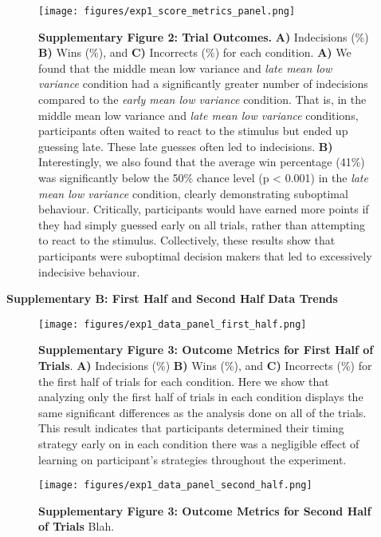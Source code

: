 \documentclass[12pt]{article}
\newcommand\boldblue[1]{\textcolor{mydarkblue}{\textbf{#1}}}
\begin{document}
\begin{figure}[H]
    \centering
    \texttt{[image: figures/exp1\_score\_metrics\_panel.png]}

    \caption*{\boldblue{Supplementary Figure 2: Trial Outcomes.} \boldblue{A)} Indecisions (\%) \boldblue{B)} Wins (\%), and \boldblue{C)} Incorrects (\%) for each condition. \boldblue{A)} We found that the middle mean low variance and \emph{late mean low variance} condition had a significantly greater number of indecisions compared to the \emph{early mean low variance} condition. That is, in the middle mean low variance and \emph{late mean low variance} conditions, participants often waited to react to the stimulus but ended up guessing late. These late guesses often led to indecisions. \boldblue{B)} Interestingly, we also found that the average win percentage (41\%) was significantly below the 50\% chance level (p < 0.001) in the \emph{late mean low variance} condition, clearly demonstrating suboptimal behaviour. Critically, participants would have earned more points if they had simply guessed early on all trials, rather than attempting to react to the stimulus. Collectively, these results show that participants were suboptimal decision makers that led to excessively indecisive behaviour.}
\end{figure}

\newpage
\noindent\boldblue{\large{Supplementary B: First Half and Second Half Data Trends}}
\vspace{-1mm}

\begin{figure}[H]
    \centering
    \texttt{[image: figures/exp1\_data\_panel\_first\_half.png]}
    \caption*{
        \boldblue{Supplementary Figure 3: Outcome Metrics for First Half of Trials}. \boldblue{A)} Indecisions (\%) \boldblue{B)} Wins (\%), and \boldblue{C)} Incorrects (\%) for the first half of trials for each condition. 
        Here we show that analyzing only the first half of trials in each condition displays the same significant differences as the analysis done on all of the trials.         
        This result indicates that participants determined their timing strategy early on in each condition there was a negligible effect of learning on participant's strategies throughout the experiment. 
    } 
\end{figure}

\begin{figure}[H]
\begin{minipage}[c]{0.6\textwidth}
    \texttt{[image: figures/exp1\_data\_panel\_second\_half.png]}
\end{minipage}\hfill
\begin{minipage}[c]{0.3\textwidth}
    \caption*{
        \boldblue{Supplementary Figure 3: Outcome Metrics for Second Half of Trials} Blah. 
    } 
\end{minipage}
\end{figure}
\end{document}
